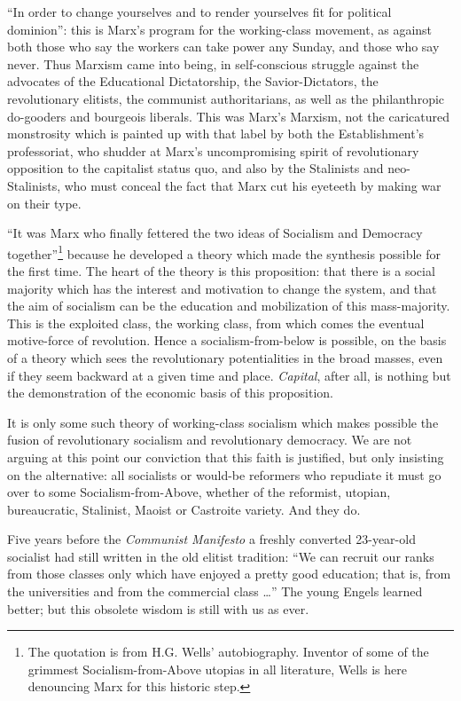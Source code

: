 ``In order to change yourselves and to render yourselves fit for political dominion'': this is Marx's program for the working-class movement, as against both those who say the workers can take power any Sunday, and those who say never. Thus Marxism came into being, in self-conscious struggle against the advocates of the Educational Dictatorship, the Savior-Dictators, the revolutionary elitists, the communist authoritarians, as well as the philanthropic do-gooders and bourgeois liberals. This was Marx's Marxism, not the caricatured monstrosity which is painted up with that label by both the Establishment's professoriat, who shudder at Marx's uncompromising spirit of revolutionary opposition to the capitalist status quo, and also by the Stalinists and neo-Stalinists, who must conceal the fact that Marx cut his eyeteeth by making war on their type.

``It was Marx who finally fettered the two ideas of Socialism and Democracy together''\footnote{The quotation is from H.G. Wells' autobiography. Inventor of some of the grimmest Socialism-from-Above utopias in all literature, Wells is here denouncing Marx for this historic step.} because he developed a theory which made the synthesis possible for the first time. The heart of the theory is this proposition: that there is a social majority which has the interest and motivation to change the system, and that the aim of socialism can be the education and mobilization of this mass-majority. This is the exploited class, the working class, from which comes the eventual motive-force of revolution. Hence a socialism-from-below is possible, on the basis of a theory which sees the revolutionary potentialities in the broad masses, even if they seem backward at a given time and place. \emph{Capital}, after all, is nothing but the demonstration of the economic basis of this proposition.

It is only some such theory of working-class socialism which makes possible the fusion of revolutionary socialism and revolutionary democracy. We are not arguing at this point our conviction that this faith is justified, but only insisting on the alternative: all socialists or would-be reformers who repudiate it must go over to some Socialism-from-Above, whether of the reformist, utopian, bureaucratic, Stalinist, Maoist or Castroite variety. And they do.

Five years before the \emph{Communist Manifesto} a freshly converted 23-year-old socialist had still written in the old elitist tradition: ``We can recruit our ranks from those classes only which have enjoyed a pretty good education; that is, from the universities and from the commercial class \ldots'' The young Engels learned better; but this obsolete wisdom is still with us as ever.

